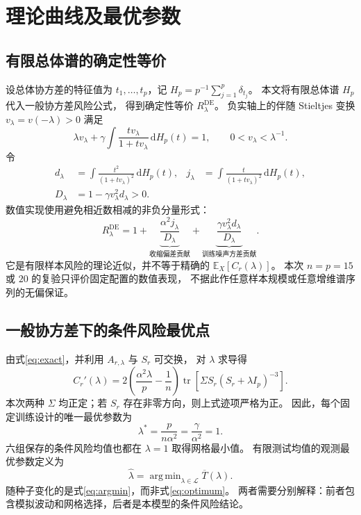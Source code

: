 \documentclass[UTF8,fontset=fandol,a4paper,zihao=-4]{ctexart}
\DeclareMathOperator{\tr}{tr}
\DeclareMathOperator*{\argmin}{arg\,min}
\newcommand{\E}{\mathbb E}
\newcommand{\Tbar}{\overline T}
\numberwithin{equation}{section}
\begin{document}
\clearpage
\section{理论曲线及最优参数}\label{sec:theory}
\subsection{有限总体谱的确定性等价}
设总体协方差的特征值为 $t_1,\ldots,t_p$，记
$H_p=p^{-1}\sum_{j=1}^p\delta_{t_j}$。
本文将有限总体谱 $H_p$ 代入一般协方差风险公式\cite{dw}，
得到确定性等价 $R_\lambda^{\mathrm{DE}}$。
负实轴上的伴随 Stieltjes 变换 $v_\lambda=v(-\lambda)>0$ 满足
\begin{equation}\label{eq:stieltjes}
 \lambda v_\lambda+\gamma\int\frac{t v_\lambda}{1+t v_\lambda}\,\mathrm dH_p(t)=1,
 \qquad 0<v_\lambda<\lambda^{-1}.
\end{equation}
令
\begin{align}
 d_\lambda&=\int\frac{t^2}{(1+t v_\lambda)^2}\,\mathrm dH_p(t),&
 j_\lambda&=\int\frac{t}{(1+t v_\lambda)^2}\,\mathrm dH_p(t),\label{eq:integrals}\\
 D_\lambda&=1-\gamma v_\lambda^2d_\lambda>0.\label{eq:stability}
\end{align}
数值实现使用避免相近数相减的非负分量形式：
\begin{equation}\label{eq:de}
 R_\lambda^{\mathrm{DE}}
 =1+\underbrace{\frac{\alpha^2j_\lambda}{D_\lambda}}_{\text{收缩偏差贡献}}
 +\underbrace{\frac{\gamma v_\lambda^2d_\lambda}{D_\lambda}}_{\text{训练噪声方差贡献}}.
\end{equation}
它是有限样本风险的理论近似，并不等于精确的 $\E_X[C_r(\lambda)]$。
本次 $n=p=15$ 或 $20$ 的复验只评价固定配置的数值表现，
不据此作任意样本规模或任意增维谱序列的无偏保证。

\subsection{一般协方差下的条件风险最优点}
由式\eqref{eq:exact}，并利用 $A_{r,\lambda}$ 与 $S_r$ 可交换，
对 $\lambda$ 求导得
\begin{equation}\label{eq:derivative}
 C_r'(\lambda)=2\left(\frac{\alpha^2\lambda}{p}-\frac1n\right)
 \tr\!\left[\Sigma S_r(S_r+\lambda I_p)^{-3}\right].
\end{equation}
本次两种 $\Sigma$ 均正定；若 $S_r$ 存在非零方向，则上式迹项严格为正。
因此，每个固定训练设计的唯一最优参数为
\begin{equation}\label{eq:optimum}
 \lambda^*=\frac{p}{n\alpha^2}=\frac\gamma{\alpha^2}=1.
\end{equation}
六组保存的条件风险均值也都在 $\lambda=1$ 取得网格最小值。
有限测试均值的观测最优参数定义为
\begin{equation}\label{eq:argmin}
 \widehat\lambda=\argmin_{\lambda\in\mathcal L}\Tbar(\lambda).
\end{equation}
随种子变化的是式\eqref{eq:argmin}，而非式\eqref{eq:optimum}。
两者需要分别解释：前者包含模拟波动和网格选择，后者是本模型的条件风险结论。
\end{document}

